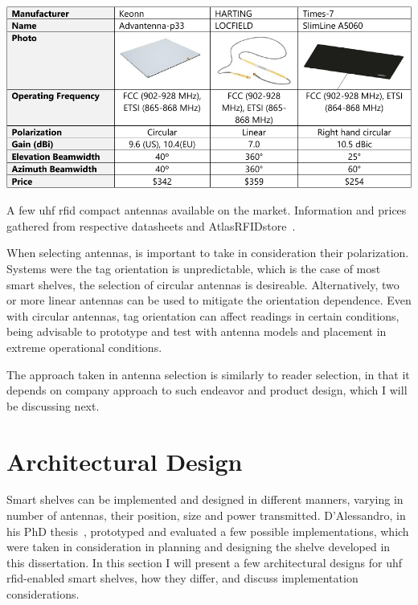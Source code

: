 \begin{table}
    \centering
    \includegraphics[width=\linewidth]{./figs/02-state-of-the-art/table_antennas.pdf}
    \caption[A few \ac{uhf} \ac{rfid} compact antennas available on the market]{A few \ac{uhf} \ac{rfid} compact antennas available on the market. Information and prices gathered from respective datasheets and AtlasRFIDstore~\cite{AtlasRFIDstoreBuyRFID}.}
    \label{tab:antennasolutions}
\end{table}

When selecting antennas, is important to take in consideration their polarization. Systems were the tag orientation is unpredictable, which is the case of most smart shelves, the selection of circular antennas is desireable. Alternatively, two or more linear antennas can be used to mitigate the orientation dependence.
Even with circular antennas, tag orientation can affect readings in certain conditions, being advisable to prototype and test with antenna models and placement in extreme operational conditions.

The approach taken in antenna selection is similarly to reader selection, in that it depends on company approach to such endeavor and product design, which I will be discussing next.

\section{Architectural Design}

Smart shelves can be implemented and designed in different manners, varying in number of antennas, their position, size and power transmitted.
D’Alessandro, in his PhD thesis~\cite{dalessandroRFIDBasedSmartShelving2012}, prototyped and evaluated a few possible implementations, which were taken in consideration in planning and designing the shelve developed in this dissertation.
In this section I will present a few architectural designs for \ac{uhf} \ac{rfid}-enabled smart shelves, how they differ, and discuss implementation considerations.

